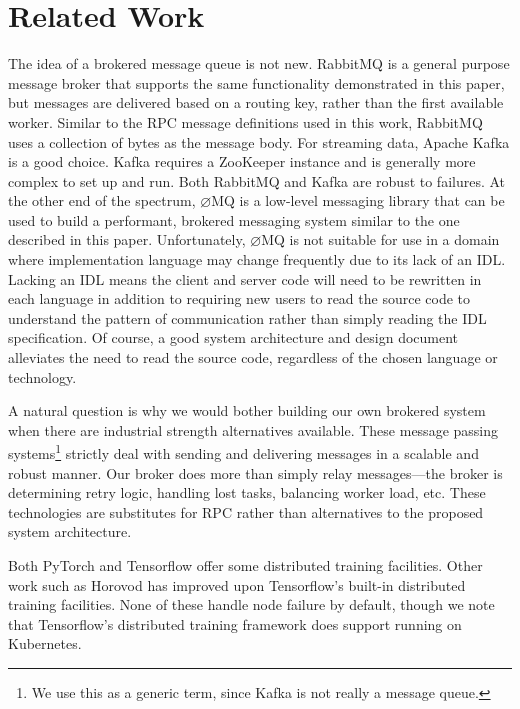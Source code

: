 \documentclass[conference]{IEEEtran}
\begin{document}
\section{Related Work}
The idea of a brokered message queue is not new. RabbitMQ \cite{rabbitmq} is a general
purpose message broker that supports the same functionality demonstrated
in this paper, but messages are delivered based on a routing key, rather than
the first available worker. Similar to the RPC message definitions used in
this work, RabbitMQ uses a collection of bytes as the message body. For
streaming data, Apache Kafka \cite{kafka} is a good choice. Kafka requires a
ZooKeeper \cite{Hunt:2010:ZWC:1855840.1855851} instance and is generally
more complex to set up and run.
Both RabbitMQ and Kafka are robust to failures. At the other end of the
spectrum, $\varnothing$MQ \cite{zmq} is a low-level messaging library that can be used
to build a performant, brokered messaging system similar to the one described
in this paper. Unfortunately, $\varnothing$MQ is not suitable for use in a
domain where implementation language may change frequently due to its lack of
an IDL. Lacking an IDL means the client and server code will need to be rewritten
in each language in addition to requiring new users to read the source code to
understand the pattern of communication rather than simply reading the IDL
specification. Of course, a good system architecture and design document alleviates
the need to read the source code, regardless of the chosen language or technology.

A natural question is why we would bother building our
own brokered system when there are industrial strength alternatives
available. These message passing systems\footnote{We use this as a generic term,
  since Kafka is not really a message queue.} strictly deal with sending and
delivering messages in a scalable and robust manner. Our broker does more than
simply relay messages---the broker is determining retry logic, handling lost
tasks, balancing worker load, etc. These technologies are substitutes for RPC
rather than alternatives to the proposed system architecture.

Both PyTorch\cite{paszke2017automatic} and Tensorflow
\cite{tensorflow2015-whitepaper} offer some distributed training
facilities. Other work such as Horovod \cite{DBLP:journals/corr/abs-1802-05799}
has improved upon Tensorflow's built-in distributed training facilities. 
None of these handle node failure by default, though we note that Tensorflow's
distributed training framework does support running on Kubernetes.
\end{document}
